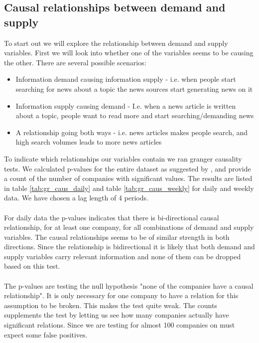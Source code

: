 \subsection{Causal relationships between demand and supply}
To start out we will explore the relationship between demand and supply variables. First we will look into whether one of the variables seems to be causing the other. There are several possible scenarios:
\begin{itemize}
\item Information demand causing information supply - i.e. when people start searching for news about a topic the news sources start generating news on it
\item Information supply causing demand - I.e. when a news article is written about a topic, people want to read more and start searching/demanding news
\item A relationship going both ways - i.e. news articles makes people search, and high search volumes leads to more news articles

\end{itemize}
To indicate which relationships our variables contain we  ran granger causality tests. We calculated p-values for the entire dataset as suggested by \cite{DUMIT}, and provide a count of the number of companies with significant values. The results are listed in table \ref{tab:gr_caus_daily} and table \ref{tab:gr_caus_weekly} for daily and weekly data. We have chosen a lag length of 4  periods. 
\\\\
For daily data the p-values indicates that there is bi-directional causal relationship, for at least one company, for all combinations of demand and supply variables. The causal relationships seems to be of similar strength in both directions. Since the relationship is bidirectional it is likely that both demand and supply variables carry relevant information and none of them can be dropped based on this test. 
\\\\
The p-values are testing the null hypothesis "none of the companies have a causal relationship". It is only necessary for one company to have a relation for this assumption to be broken. This makes the test quite weak. The counts supplements the test by letting us see how many companies actually have significant relations. Since we are testing for almost 100 companies on must expect some false positives.
\\\\
